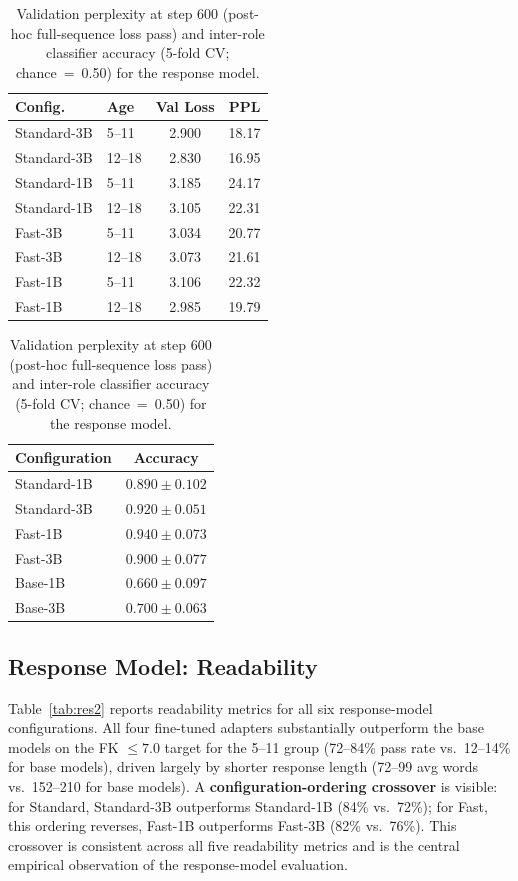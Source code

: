 \documentclass[pdflatex,sn-mathphys-num]{sn-jnl}%
\begin{document}
\begin{table}[!h]
  \centering
  \caption{Validation perplexity at step 600 (post-hoc full-sequence loss pass) and inter-role classifier accuracy (5-fold CV; chance~=~0.50) for the response model.}
  \label{tab:res1}
  \small
    \begin{tabular}{@{}llcc@{}}
    \toprule
    Config. & Age & Val Loss & PPL \\
    \midrule
    Standard-3B & 5--11  & 2.900 & 18.17 \\
    Standard-3B & 12--18 & 2.830 & 16.95 \\
    Standard-1B & 5--11  & 3.185 & 24.17 \\
    Standard-1B & 12--18 & 3.105 & 22.31 \\
    Fast-3B     & 5--11  & 3.034 & 20.77 \\
    Fast-3B     & 12--18 & 3.073 & 21.61 \\
    Fast-1B     & 5--11  & 3.106 & 22.32 \\
    Fast-1B     & 12--18 & 2.985 & 19.79 \\
    \bottomrule
  \end{tabular}
  \qquad
    \begin{tabular}{@{}lc@{}}
    \toprule
    Configuration & Accuracy \\
    \midrule
    Standard-1B & $0.890 \pm 0.102$ \\
    Standard-3B & $0.920 \pm 0.051$ \\
    Fast-1B     & $0.940 \pm 0.073$ \\
    Fast-3B     & $0.900 \pm 0.077$ \\
    Base-1B     & $0.660 \pm 0.097$ \\
    Base-3B     & $0.700 \pm 0.063$ \\
    \bottomrule
  \end{tabular}
\end{table}

\subsection{Response Model: Readability}

Table~\ref{tab:res2} reports readability metrics for all six response-model configurations. All four fine-tuned adapters substantially outperform the base models on the FK $\leq 7.0$ target for the 5--11 group (72--84\% pass rate vs.\ 12--14\% for base models), driven largely by shorter response length (72--99 avg words vs.\ 152--210 for base models). A \textbf{configuration-ordering crossover} is visible: for Standard, Standard-3B outperforms Standard-1B (84\% vs.\ 72\%); for Fast, this ordering reverses, Fast-1B outperforms Fast-3B (82\% vs.\ 76\%). This crossover is consistent across all five readability metrics and is the central empirical observation of the response-model evaluation.
\end{document}
